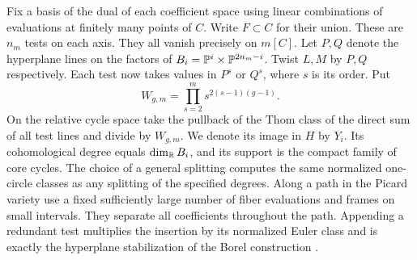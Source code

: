 Fix a basis of the dual of each coefficient space using linear
combinations of evaluations at finitely many points of $C$.
Write $F\subset C$ for their union. These are $n_m$ tests on each
axis. They all vanish precisely on $m[C]$.
Let $P,Q$ denote the hyperplane lines on the factors of
$B_i=\mathbb P^i\times\mathbb P^{2n_m-i}$. Twist $L,M$ by $P,Q$ respectively.
Each test now takes values in $P^s$ or $Q^s$, where $s$ is its
order. Put
\[
 W_{g,m}=\prod_{s=2}^m s^{2(s-1)(g-1)}.
\]
On the relative cycle space take the pullback of the Thom class of
the direct sum of all test lines and divide by $W_{g,m}$. We denote
its image in $H$ by $Y_i$. Its cohomological degree equals
$\dim_{\mathbb R}B_i$, and its support is the compact family of core cycles.
The choice of a general splitting computes the same normalized
one-circle classes as any splitting of the specified degrees.
Along a path in the Picard variety use a fixed sufficiently large
number of fiber evaluations and frames on small intervals. They
separate all coefficients throughout the path. Appending a redundant
test multiplies the insertion by its normalized Euler class and is
exactly the hyperplane stabilization of the Borel construction
\cite[\S2]{WueBalanced}.

